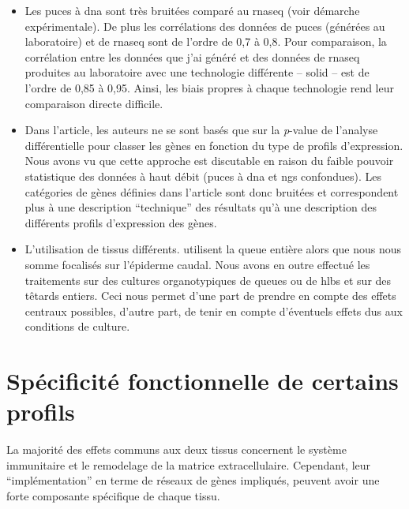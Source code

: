 \documentclass[../main.tex]{subfiles}
\begin{document}
	\begin{itemize}
		\item
			Les puces à \gls{dna} sont très bruitées comparé au \gls{rnaseq} (voir démarche expérimentale).
			De plus les corrélations des données de puces (générées au laboratoire) et de \gls{rnaseq} sont de l'ordre de 0,7 à 0,8.
			Pour comparaison, la corrélation entre les données que j'ai généré et des données de \gls{rnaseq} produites au laboratoire avec une technologie différente – \gls{solid} – est de l'ordre de 0,85 à 0,95.
			Ainsi, les biais propres à chaque technologie rend leur comparaison directe difficile.
		\item
			Dans l'article, les auteurs ne se sont basés que sur la \textit{p}-value de l'analyse différentielle pour classer les gènes en fonction du type de profils d'expression.
			Nous avons vu que cette approche est discutable en raison du faible pouvoir statistique des données à haut débit (puces à \gls{dna} et \gls{ngs} confondues).
			Les catégories de gènes définies dans l'article sont donc bruitées et correspondent plus à une description ``technique'' des résultats qu'à une description des différents profils d'expression des gènes.
		\item
			L'utilisation de tissus différents.
			\citep{Kulkarni2011} utilisent la queue entière alors que nous nous somme focalisés sur l'épiderme caudal.
			Nous avons en outre effectué les traitements sur des cultures organotypiques de queues ou de \glspl{hlb} et sur des têtards entiers.
			Ceci nous permet d'une part de prendre en compte des effets centraux possibles, d'autre part, de tenir en compte d'éventuels effets dus aux conditions de culture.
	\end{itemize}


\section{Spécificité fonctionnelle de certains profils}

	La majorité des effets communs aux deux tissus concernent le système immunitaire et le remodelage de la matrice extracellulaire.
	Cependant, leur ``implémentation'' en terme de réseaux de gènes impliqués, peuvent avoir une forte composante spécifique de chaque tissu.
\end{document}
